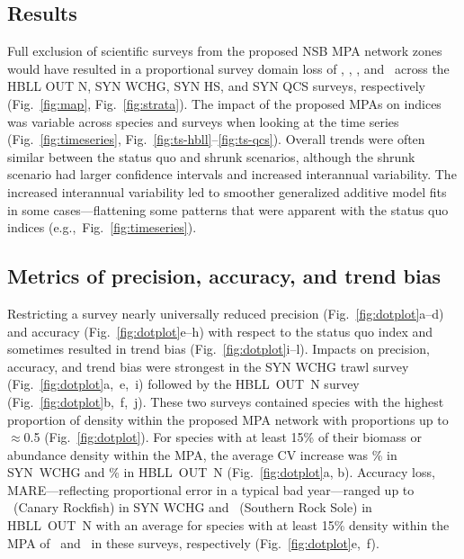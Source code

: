 \documentclass[12pt]{article}
\begin{document}
\begin{spacing}{1.4}
\section*{Results}

Full exclusion of scientific surveys from the proposed NSB MPA network zones would have resulted in a proportional survey domain loss of \lostHBLL, \lostWCHG, \lostHS, and \lostQCS\ across the HBLL OUT N, SYN WCHG, SYN HS, and SYN QCS surveys, respectively (Fig.~\ref{fig:map}, Fig.~\ref{fig:strata}).
The impact of the proposed MPAs on indices was variable across species and surveys when looking at the time series (Fig.~\ref{fig:timeseries}, Fig.~\ref{fig:ts-hbll}--\ref{fig:ts-qcs}).
Overall trends were often similar between the status quo and shrunk scenarios, although the shrunk scenario had larger confidence intervals and increased interannual variability.
The increased interannual variability led to smoother generalized additive model fits in some cases---flattening some patterns that were apparent with the status quo indices (e.g.,~Fig.~\ref{fig:timeseries}).

\subsection*{Metrics of precision, accuracy, and trend bias}

Restricting a survey nearly universally reduced precision (Fig.~\ref{fig:dotplot}a--d) and accuracy (Fig.~\ref{fig:dotplot}e--h) with respect to the status quo index and sometimes resulted in trend bias (Fig.~\ref{fig:dotplot}i--l).
Impacts on precision, accuracy, and trend bias were strongest in the SYN WCHG trawl survey (Fig.~\ref{fig:dotplot}a,~e,~i) followed by the HBLL~OUT~N survey (Fig.~\ref{fig:dotplot}b,~f,~j).
These two surveys contained species with the highest proportion of density within the proposed MPA network with proportions up to $\approx$0.5 (Fig.~\ref{fig:dotplot}).
For species with at least 15\% of their biomass or abundance density within the MPA, the average CV increase was \precisionWCHGshrunk\% in SYN~WCHG and \precisionHBLLshrunk\% in HBLL~OUT~N (Fig.~\ref{fig:dotplot}a, b).
Accuracy loss, MARE---reflecting proportional error in a typical bad year---ranged up to \canaryrockfishSYNWCHGslopere\ (Canary Rockfish) in SYN WCHG and \southernrocksoleHBLLslopere\ (Southern Rock Sole) in HBLL~OUT~N with an average for species with at least 15\% density within the MPA of \accuracyWCHGshrunk\ and \accuracyHBLLshrunk\ in these surveys, respectively (Fig.~\ref{fig:dotplot}e,~f).


\end{spacing}
\end{document}
